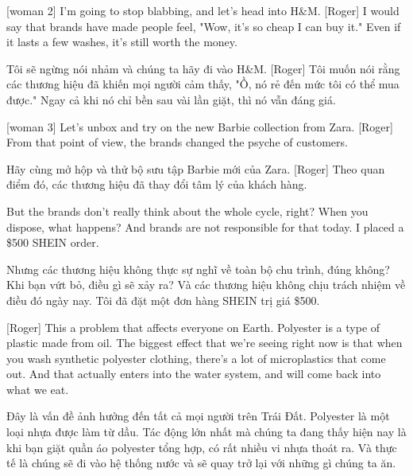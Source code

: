 \documentclass[a4paper]{article}
\begin{document}
	[woman 2] I'm going to stop blabbing, and let's head into H\&M.
	[Roger] I would say that brands have made people feel, "Wow, it's so cheap I can buy it."
	Even if it lasts a few washes, it's still worth the money.
	
	\begin{vietnamese-v2}
		 Tôi sẽ ngừng nói nhảm và chúng ta hãy đi vào H\&M.
		[Roger] Tôi muốn nói rằng các thương hiệu đã khiến mọi người cảm thấy, "Ồ, nó rẻ đến mức tôi có thể mua được."
		Ngay cả khi nó chỉ bền sau vài lần giặt, thì nó vẫn đáng giá.
	\end{vietnamese-v2}
	
	
	[woman 3] Let's unbox and try on the new Barbie collection from Zara.
	[Roger] From that point of view, the brands changed the psyche of customers.
	
	\begin{vietnamese-v2}
		[phụ nữ 3] Hãy cùng mở hộp và thử bộ sưu tập Barbie mới của Zara.
		[Roger] Theo quan điểm đó, các thương hiệu đã thay đổi tâm lý của khách hàng.
	\end{vietnamese-v2}
	
	But the brands don't really think about the whole cycle, right?
	When you dispose, what happens?
	And brands are not responsible for that today.
	I placed a \$500 SHEIN order.
	
	\begin{vietnamese-v2}
		Nhưng các thương hiệu không thực sự nghĩ về toàn bộ chu trình, đúng không?
		Khi bạn vứt bỏ, điều gì sẽ xảy ra?
		Và các thương hiệu không chịu trách nhiệm về điều đó ngày nay.
		Tôi đã đặt một đơn hàng SHEIN trị giá \$500.
	\end{vietnamese-v2}
	
	
	[Roger] This a problem that affects everyone on Earth.
	Polyester is a type of plastic made from oil.
	The biggest effect that we're seeing right now
	is that when you wash synthetic polyester clothing, there's a lot of microplastics that come out.
	And that actually enters into the water system, and will come back into what we eat.
	
	\begin{vietnamese-v2}
		[Roger] Đây là vấn đề ảnh hưởng đến tất cả mọi người trên Trái Đất.
		Polyester là một loại nhựa được làm từ dầu.
		Tác động lớn nhất mà chúng ta đang thấy hiện nay
		là khi bạn giặt quần áo polyester tổng hợp, có rất nhiều vi nhựa thoát ra.
		Và thực tế là chúng sẽ đi vào hệ thống nước và sẽ quay trở lại với những gì chúng ta ăn.
	\end{vietnamese-v2}
	
\end{document}
